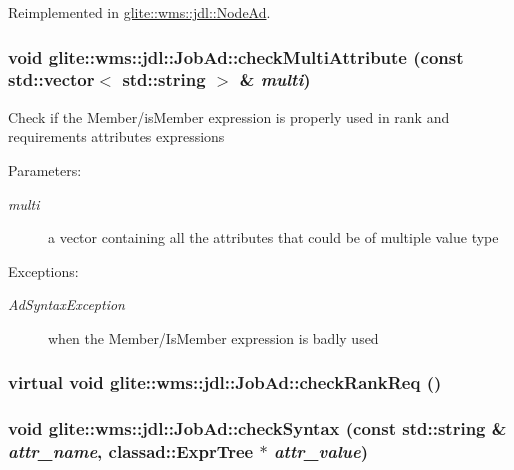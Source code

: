 Reimplemented in \hyperlink{classglite_1_1wms_1_1jdl_1_1NodeAd_b0}{glite::wms::jdl::Node\-Ad}.\hypertarget{classglite_1_1wms_1_1jdl_1_1JobAd_z9_1}{
\subsubsection[checkMultiAttribute]{\setlength{\rightskip}{0pt plus 5cm}void glite::wms::jdl::Job\-Ad::check\-Multi\-Attribute (const std::vector$<$ std::string $>$ \& {\em multi})}}
\label{classglite_1_1wms_1_1jdl_1_1JobAd_z9_1}


Check if the Member/is\-Member expression is properly used in rank and requirements attributes expressions \begin{Desc}
\item[Parameters:]
\begin{description}
\item[{\em multi}]a vector containing all the attributes that could be of multiple value type \end{description}
\end{Desc}
\begin{Desc}
\item[Exceptions:]
\begin{description}
\item[{\em Ad\-Syntax\-Exception}]when the Member/Is\-Member expression is badly used \end{description}
\end{Desc}
\hypertarget{classglite_1_1wms_1_1jdl_1_1JobAd_b1}{
\subsubsection[checkRankReq]{\setlength{\rightskip}{0pt plus 5cm}virtual void glite::wms::jdl::Job\-Ad::check\-Rank\-Req ()}}
\label{classglite_1_1wms_1_1jdl_1_1JobAd_b1}


\hypertarget{classglite_1_1wms_1_1jdl_1_1JobAd_z9_0}{
\subsubsection[checkSyntax]{\setlength{\rightskip}{0pt plus 5cm}void glite::wms::jdl::Job\-Ad::check\-Syntax (const std::string \& {\em attr\_\-name}, classad::Expr\-Tree $\ast$ {\em attr\_\-value})}}
\label{classglite_1_1wms_1_1jdl_1_1JobAd_z9_0}


